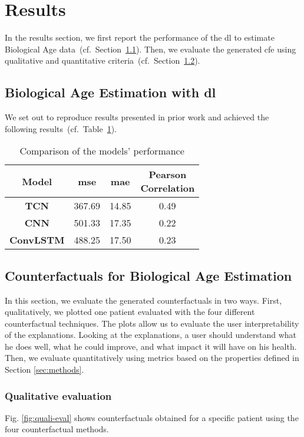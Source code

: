 \section{Results}
\label{sec:results}
In the results section, we first report the performance of the \gls{dl} to estimate Biological Age data~(cf.~Section~\ref{sec:results:dl-training}). Then, we evaluate the generated \gls{cfe} using qualitative and quantitative criteria~(cf.~Section~\ref{sec:results:cf}).

\subsection{Biological Age Estimation with \gls{dl}}
\label{sec:results:dl-training}
We set out to reproduce results presented in prior work \cite{pyrkov_extracting_2018, rahman_deep_2019} and achieved the following results~(cf.~Table~\ref{tab:models}).
\begin{table}[h!]
    \centering
    \begin{tabular}{cccc}
        \toprule
        \textbf{Model} & \textbf{\gls{mse}} & \textbf{\gls{mae}} & \makecell{\textbf{Pearson} \\\textbf{Correlation}}\\
        \midrule
        \textbf{TCN} & 367.69 & 14.85 & 0.49\\
        \textbf{CNN} & 501.33 & 17.35 & 0.22\\
        \textbf{ConvLSTM} & 488.25 & 17.50 & 0.23\\
        \bottomrule
    \end{tabular}
    \caption{Comparison of the models' performance}
    \label{tab:models}
\end{table}
\subsection{Counterfactuals for Biological Age Estimation}
\label{sec:results:cf}
In this section, we evaluate the generated counterfactuals in two ways. First, qualitatively, we plotted one patient evaluated with the four different counterfactual techniques. The plots allow us to evaluate the user interpretability of the explanations. Looking at the explanations, a user should understand what he does well, what he could improve, and what impact it will have on his health. Then, we evaluate quantitatively using metrics based on the properties defined in Section \ref{sec:methods}. 

\subsubsection{Qualitative evaluation}

 Fig. \ref{fig:quali-eval} shows counterfactuals obtained for a specific patient using the four counterfactual methods.

